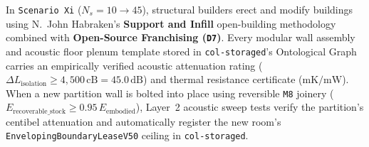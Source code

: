 In \texttt{Scenario Xi} ($N_s = 10 \to 45$), structural builders erect and modify buildings using N.~John Habraken's \textbf{Support and Infill} open-building methodology \parencite{habraken1972supports} combined with \textbf{Open-Source Franchising (\texttt{D7})}. Every modular wall assembly and acoustic floor plenum template stored in \texttt{col-storaged}'s Ontological Graph carries an empirically verified acoustic attenuation rating ($\Delta L_{\mathrm{isolation}} \ge 4{,}500\,\mathrm{cB} = 45.0\,\mathrm{dB}$) and thermal resistance certificate ($\mathrm{mK/mW}$). When a new partition wall is bolted into place using reversible \texttt{M8} joinery ($E_{\mathrm{recoverable\_stock}} \ge 0.95\,E_{\mathrm{embodied}}$), Layer~2 acoustic sweep tests verify the partition's centibel attenuation and automatically register the new room's \texttt{EnvelopingBoundaryLeaseV50} ceiling in \texttt{col-storaged}.

